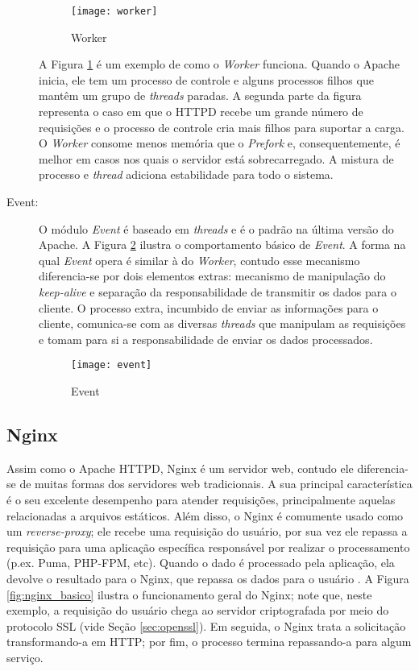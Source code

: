 \begin{description}
\begin{figure}[!h]
  \centering
  \texttt{[image: worker]} 
  \caption{Worker}
  \label{fig:worker} 
\end{figure}

A Figura \ref{fig:worker} é um exemplo de como o \emph{Worker} funciona.
Quando o Apache inicia, ele tem um processo de controle e alguns processos
filhos que mantêm um grupo de \emph{threads} paradas. A segunda parte da figura
representa o caso em que o HTTPD recebe um grande número de requisições e o
processo de controle cria mais filhos para suportar a carga. O \emph{Worker}
consome menos memória que o \emph{Prefork} e, consequentemente, é melhor em
casos nos quais o servidor está sobrecarregado.  A mistura de processo e \emph{thread}
adiciona estabilidade para todo o sistema.

  \item [Event:] O módulo \emph{Event} é baseado em \emph{threads} e é o padrão
na última versão do Apache. A Figura \ref{fig:event} ilustra o comportamento
básico de \emph{Event}. A forma na qual \emph{Event} opera é similar à do
\emph{Worker}, contudo esse mecanismo diferencia-se por dois elementos extras:
mecanismo de manipulação do \emph{keep-alive} e separação da responsabilidade
de transmitir os dados para o cliente. O processo extra, incumbido de enviar as
informações para o cliente, comunica-se com as diversas \emph{threads} que
manipulam as requisições e tomam para si a responsabilidade de enviar os dados
processados.

\begin{figure}[!h]
  \centering
  \texttt{[image: event]} 
  \caption{Event}
  \label{fig:event} 
\end{figure}

\end{description}

\subsection{Nginx}

Assim como o Apache HTTPD, Nginx é um servidor web, contudo ele diferencia-se
de muitas formas dos servidores web tradicionais. A sua principal
característica é o seu excelente desempenho para atender requisições,
principalmente aquelas relacionadas a arquivos estáticos. Além disso, o Nginx
é comumente usado como um \emph{reverse-proxy}; ele recebe uma requisição do
usuário, por sua vez ele repassa a requisição para uma aplicação específica
responsável por realizar o processamento (p.ex. Puma, PHP-FPM, etc). Quando o
dado é processado pela aplicação, ela devolve o resultado para o Nginx, que
repassa os dados para o usuário \citep{soni}. A Figura \ref{fig:nginx_basico}
ilustra o funcionamento geral do Nginx; note que, neste exemplo, a requisição
do usuário chega ao servidor criptografada por meio do protocolo SSL
(vide Seção \ref{sec:openssl}). Em seguida, o Nginx
trata a solicitação transformando-a em HTTP; por fim, o processo termina
repassando-a para algum serviço.

